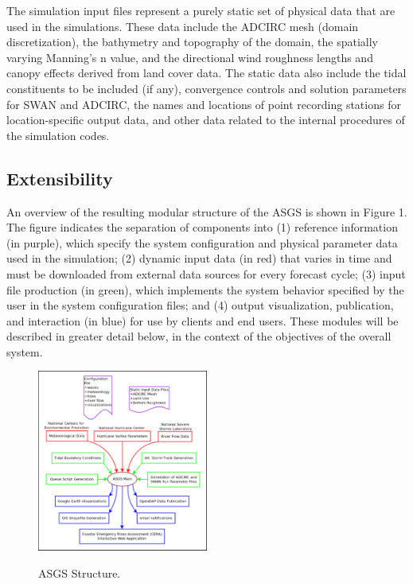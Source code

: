 \documentclass[jmse,article,submit,moreauthors,pdftex,12pt,a4paper]{mdpi}
\begin{document}
The simulation input files represent a purely static set of physical 
data that are used in the simulations. These data include the ADCIRC 
mesh (domain discretization), the bathymetry and topography of the 
domain, the spatially varying Manning's n value, and the directional 
wind roughness lengths and canopy effects derived from land cover 
data. The static data also include the tidal constituents to be 
included (if any), convergence controls and solution parameters for 
SWAN and ADCIRC, the names and locations of point recording stations 
for location-specific output data, and other data related to the 
internal procedures of the simulation codes. 

\subsection{Extensibility}

An overview of the resulting modular structure of the ASGS is shown 
in Figure 1. The figure indicates the separation of components into 
(1) reference information (in purple), which specify the system 
configuration and physical parameter data used in the simulation; 
(2) dynamic input data (in red) that varies in time and must be 
downloaded from external data sources for every forecast cycle; (3) 
input file production (in green), which implements the system 
behavior specified by the user in the system configuration files; 
and (4) output visualization, publication, and interaction (in blue) 
for use by clients and end users. These modules will be described in 
greater detail below, in the context of the objectives of the 
overall system. 

\begin{figure}[t]
  \centering
  \includegraphics[width=0.5\textwidth]{asgs_structure_color}\\
  \caption{ASGS Structure.}
  \label{fig:asgs_structure}
\end{figure}
\end{document}
